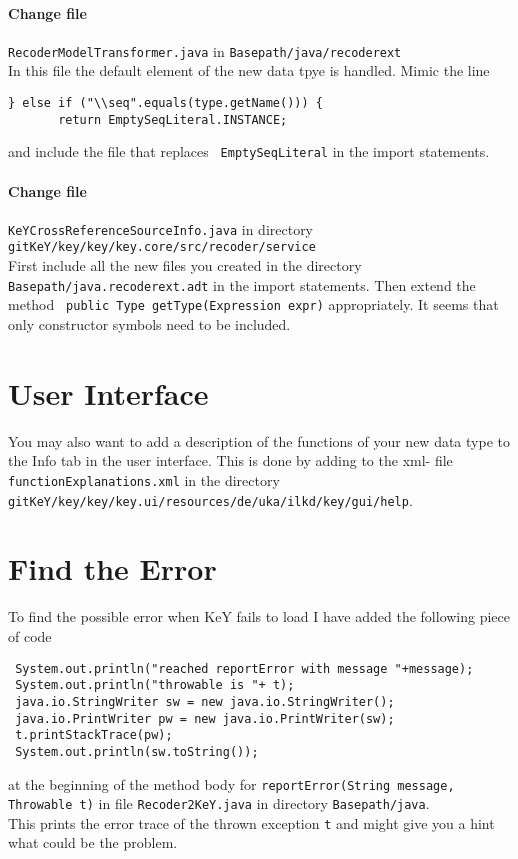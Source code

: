 \documentclass[11pt]{article}
\begin{document}
\paragraph{Change file} \verb+RecoderModelTransformer.java+ in 
\verb+Basepath/java/recoderext+\\[5pt]
In this file the default element of the new data tpye is handled.
Mimic the line
\begin{verbatim}
} else if ("\\seq".equals(type.getName())) {
       return EmptySeqLiteral.INSTANCE;
\end{verbatim}
and include the file that replaces \verb+ EmptySeqLiteral+ in the import statements.


 \paragraph{Change file} \verb+KeYCrossReferenceSourceInfo.java+ in directory\\[5pt]
\verb+gitKeY/key/key/key.core/src/recoder/service+\\[5pt]
First include all the new files you created in the directory\\
\verb+Basepath/java.recoderext.adt+ in the import statements. Then extend the method
\verb+ public Type getType(Expression expr)+ appropriately.
It seems that only constructor  symbols need to be included.

\section{User Interface}
You may also want to add a description of the functions of your new data type to the Info
tab in the user interface. This is done by adding to the xml- file
\verb+functionExplanations.xml+
in the directory \\
\verb+gitKeY/key/key/key.ui/resources/de/uka/ilkd/key/gui/help+.

\section{Find the Error}
To find the possible error when KeY fails to load I have added the following piece of code
\begin{verbatim}
 System.out.println("reached reportError with message "+message); 
 System.out.println("throwable is "+ t); 
 java.io.StringWriter sw = new java.io.StringWriter();
 java.io.PrintWriter pw = new java.io.PrintWriter(sw);
 t.printStackTrace(pw);
 System.out.println(sw.toString());
\end{verbatim}
at the beginning of the method body for 
\verb+reportError(String message, Throwable t)+ in file
\verb+Recoder2KeY.java+ in directory \verb+Basepath/java+.\\
This prints the error trace of the thrown exception \verb+t+ and might
give you a hint what could be the problem.
\end{document}
